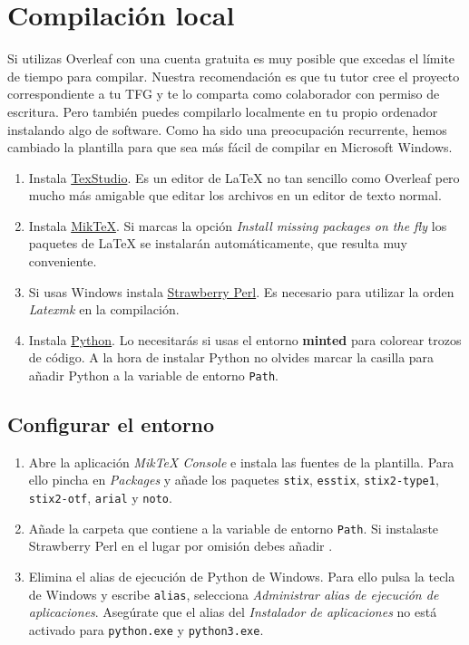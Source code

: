 \section{Compilación local} 
\label{sec:local}

Si utilizas Overleaf con una cuenta gratuita es muy posible que excedas el límite de tiempo para compilar. Nuestra recomendación es que tu tutor cree el proyecto correspondiente a tu TFG y te lo comparta como colaborador con permiso de escritura.  Pero también puedes compilarlo localmente en tu propio ordenador instalando algo de software. Como ha sido una preocupación recurrente, hemos cambiado la plantilla para que sea más fácil de compilar en Microsoft Windows.

\begin{enumerate}
\item Instala \href{https://www.texstudio.org/}{TexStudio}. Es un editor de \LaTeX{} no tan sencillo como Overleaf pero mucho más amigable que editar los archivos en un editor de texto normal.
\item Instala \href{https://miktex.org/download}{MikTeX}. Si marcas la opción \emph{Install missing packages on the fly} los paquetes de \LaTeX{} se instalarán automáticamente, que resulta muy conveniente.
\item Si usas Windows instala \href{https://strawberryperl.com/}{Strawberry Perl}. Es necesario para utilizar la orden \emph{Latexmk} en la compilación.
\item Instala \href{https://python.org}{Python}. Lo necesitarás si usas el entorno \textbf{minted} para colorear trozos de código. A la hora de instalar Python no olvides marcar la casilla para añadir Python a la variable de entorno \texttt{Path}.
\end{enumerate}

\subsection{Configurar el entorno}

\begin{enumerate}
\item Abre la aplicación \emph{MikTeX Console} e instala las fuentes de la plantilla. Para ello pincha en \emph{Packages} y añade los paquetes \texttt{stix}, \texttt{esstix}, \texttt{stix2-type1}, \texttt{stix2-otf}, \texttt{arial} y \texttt{noto}.
\item Añade la carpeta que contiene  a la variable de entorno \texttt{Path}.  Si instalaste Strawberry Perl en el lugar por omisión debes añadir .
\item Elimina el alias de ejecución de Python de Windows.  Para ello pulsa la tecla de Windows y escribe \texttt{alias}, selecciona \emph{Administrar alias de ejecución de aplicaciones}. Asegúrate que el alias del \emph{Instalador de aplicaciones} no está activado para \texttt{python.exe} y \texttt{python3.exe}.
\end{enumerate}


